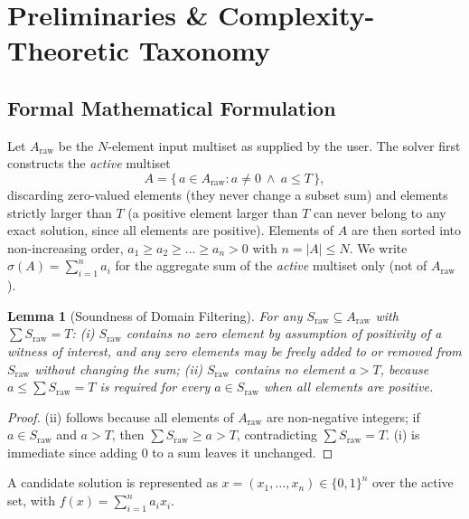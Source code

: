 \documentclass[journal,onecolumn,11pt]{IEEEtran}
\newtheorem{lemma}{Lemma}
\begin{document}
\section{Preliminaries \& Complexity-Theoretic Taxonomy}
\label{sec:preliminaries}

\subsection{Formal Mathematical Formulation}
Let $A_{\text{raw}}$ be the $N$-element input multiset as supplied by the user. The solver first constructs the \emph{active} multiset
\begin{equation}
    A = \{\, a \in A_{\text{raw}} : a \neq 0 \ \wedge\ a \le T \,\},
    \label{eq:active_set}
\end{equation}
discarding zero-valued elements (they never change a subset sum) and elements strictly larger than $T$ (a positive element larger than $T$ can never belong to any exact solution, since all elements are positive). Elements of $A$ are then sorted into non-increasing order, $a_1 \ge a_2 \ge \dots \ge a_n > 0$ with $n = |A| \le N$. We write $\sigma(A) = \sum_{i=1}^{n} a_i$ for the aggregate sum of the \emph{active} multiset only (not of $A_{\text{raw}}$).

\begin{lemma}[Soundness of Domain Filtering]
\label{lem:filter}
For any $S_{\text{raw}} \subseteq A_{\text{raw}}$ with $\sum S_{\text{raw}} = T$: (i) $S_{\text{raw}}$ contains no zero element by assumption of positivity of a witness of interest, and any zero elements may be freely added to or removed from $S_{\text{raw}}$ without changing the sum; (ii) $S_{\text{raw}}$ contains no element $a > T$, because $a \le \sum S_{\text{raw}} = T$ is required for every $a \in S_{\text{raw}}$ when all elements are positive.
\end{lemma}
\begin{proof}
(ii) follows because all elements of $A_{\text{raw}}$ are non-negative integers; if $a \in S_{\text{raw}}$ and $a > T$, then $\sum S_{\text{raw}} \ge a > T$, contradicting $\sum S_{\text{raw}} = T$. (i) is immediate since adding $0$ to a sum leaves it unchanged.
\end{proof}

A candidate solution is represented as $x = (x_1, \dots, x_n) \in \{0,1\}^n$ over the active set, with $f(x) = \sum_{i=1}^n a_i x_i$.
\end{document}
